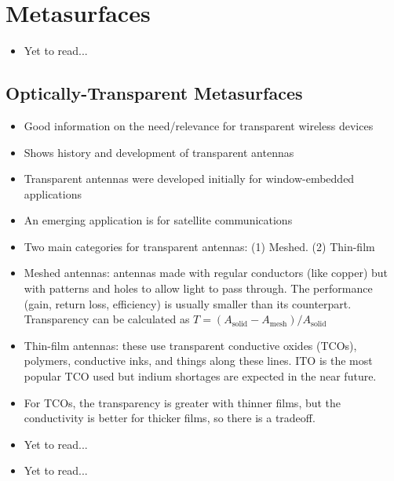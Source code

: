 \chapter{Metasurfaces} 

\begin{itemize}
    \item Yet to read...
\end{itemize}

\section{Optically-Transparent Metasurfaces}

\begin{itemize}
    \item Good information on the need/relevance for transparent wireless devices
    \item Shows history and development of transparent antennas
    \item Transparent antennas were developed initially for window-embedded applications
    \item An emerging application is for satellite communications
    \item Two main categories for transparent antennas: (1) Meshed. (2) Thin-film
    \item Meshed antennas: antennas made with regular conductors (like copper) but with patterns and holes to allow light to pass through. The performance (gain, return loss, efficiency) is usually smaller than its counterpart. Transparency can be calculated as $T = (A_\text{solid} - A_\text{mesh})/A_\text{solid}$
    \item Thin-film antennas: these use transparent conductive oxides (TCOs), polymers, conductive inks, and things along these lines. ITO is the most popular TCO used but indium shortages are expected in the near future. 
    \item For TCOs, the transparency is greater with thinner films, but the conductivity is better for thicker films, so there is a tradeoff. 
\end{itemize}

\begin{itemize}
    \item Yet to read...
\end{itemize}

\begin{itemize}
    \item Yet to read... 
\end{itemize}